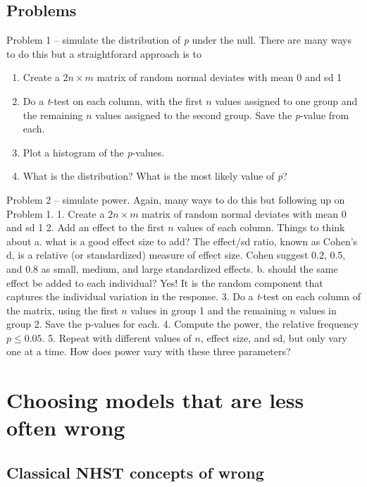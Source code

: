 \documentclass[]{book}
\providecommand{\tightlist}{%
  \setlength{\itemsep}{0pt}\setlength{\parskip}{0pt}}
\begin{document}
\hypertarget{problems}{%
\section{Problems}\label{problems}}

Problem 1 -- simulate the distribution of \emph{p} under the null. There are many ways to do this but a straightforard approach is to

\begin{enumerate}
\def\labelenumi{\arabic{enumi}.}
\tightlist
\item
  Create a \(2n \times m\) matrix of random normal deviates with mean 0 and sd 1
\item
  Do a \emph{t}-test on each column, with the first \(n\) values assigned to one group and the remaining \(n\) values assigned to the second group. Save the \emph{p}-value from each.
\item
  Plot a histogram of the \emph{p}-values.
\item
  What is the distribution? What is the most likely value of \emph{p}?
\end{enumerate}

Problem 2 -- simulate power. Again, many ways to do this but following up on Problem 1.
1. Create a \(2n \times m\) matrix of random normal deviates with mean 0 and sd 1
2. Add an effect to the first \(n\) values of each column. Things to think about
a. what is a good effect size to add? The effect/sd ratio, known as Cohen's d, is a relative (or standardized) measure of effect size. Cohen suggest 0.2, 0.5, and 0.8 as small, medium, and large standardized effects.
b. should the same effect be added to each individual? Yes! It is the random component that captures the individual variation in the response.
3. Do a \emph{t}-test on each column of the matrix, using the first \(n\) values in group 1 and the remaining \(n\) values in group 2. Save the p-values for each.
4. Compute the power, the relative frequency \(p \le 0.05\).
5. Repeat with different values of \(n\), effect size, and sd, but only vary one at a time. How does power vary with these three parameters?

\hypertarget{choosing-models-that-are-less-often-wrong}{%
\chapter{Choosing models that are less often wrong}\label{choosing-models-that-are-less-often-wrong}}

\hypertarget{classical-nhst-concepts-of-wrong}{%
\section{Classical NHST concepts of wrong}\label{classical-nhst-concepts-of-wrong}}
\end{document}

